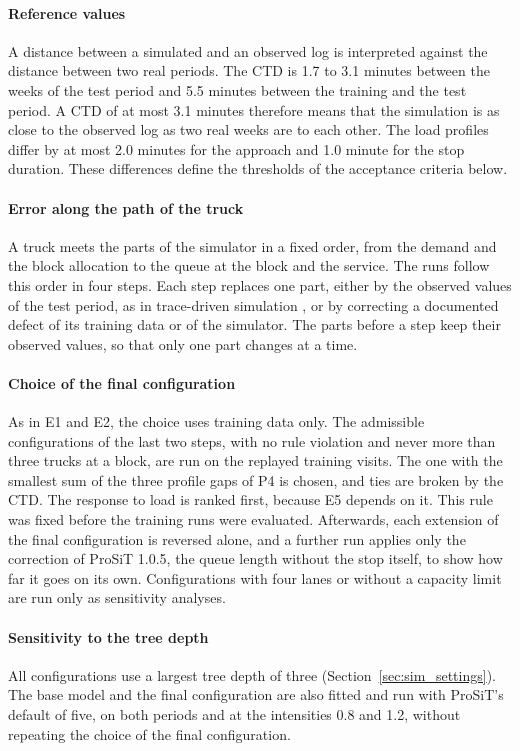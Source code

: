 \paragraph{Reference values} A distance between a simulated and an observed log is
interpreted against the distance between two real periods. The CTD is 1.7 to 3.1
minutes between the weeks of the test period and 5.5 minutes between the training
and the test period. A CTD of at most 3.1 minutes therefore means that the simulation
is as close to the observed log as two real weeks are to each other. The load profiles differ by at most 2.0 minutes for the approach
and 1.0 minute for the stop duration. These differences define the thresholds of the
acceptance criteria below.

\paragraph{Error along the path of the truck} A truck meets the parts of the
simulator in a fixed order, from the demand and the block allocation to the queue at
the block and the service. The runs follow this order in four steps. Each step
replaces one part, either by the observed values of the test period, as in
trace-driven simulation \cite{Law2015Simulation}, or by correcting a documented
defect of its training data or of the simulator. The parts before a step keep their
observed values, so that only one part changes at a time.

\paragraph{Choice of the final configuration} As in E1 and E2, the choice uses
training data only. The admissible configurations of the last two steps, with no rule
violation and never more than three trucks at a block, are run on the replayed
training visits. The one with the smallest sum of the three profile gaps of P4 is
chosen, and ties are broken by the CTD. The response to load is ranked first,
because E5 depends on it. This rule was fixed before the training runs were
evaluated. Afterwards, each extension of the final configuration is reversed alone,
and a further run applies only the correction of ProSiT 1.0.5, the queue length
without the stop itself, to show how far it goes on its own. Configurations with four
lanes or without a capacity limit are run only as sensitivity analyses.

\paragraph{Sensitivity to the tree depth} All configurations use a largest tree depth
of three (Section~\ref{sec:sim_settings}). The base model and the final configuration
are also fitted and run with ProSiT's default of five, on both periods and at the
intensities 0.8 and 1.2, without repeating the choice of the final configuration.


